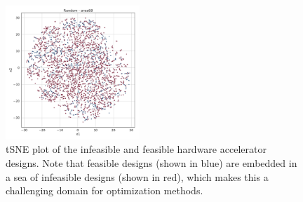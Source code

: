 \begin{table}[t!]
\small{
\begin{center}
\caption{\footnotesize {The evaluated applications, their model parameter size, number of compute operations, and normalized compute-to-memory ratio.}}
\label{tab:compute_memory_ratio}
\vspace{-0.1in}
\end{center}
\vspace{-0.1cm}
}
\end{table}

\begin{figure}[ht]
    \centering
    \includegraphics[width=0.45\textwidth]{chapters/prime/figs/tsne/tsne_infeasible.pdf}
    \caption{tSNE plot of the infeasible and feasible hardware accelerator designs. Note that feasible designs (shown in blue) are embedded in a sea of infeasible designs (shown in red), which makes this a challenging domain for optimization methods.}
    \label{fig:tsne_infeasible}
    \vspace{-0.1in}
\end{figure}

